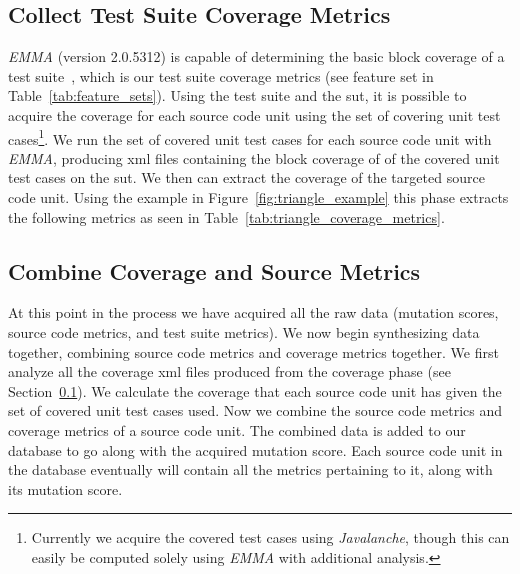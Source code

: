 \subsection{Collect Test Suite Coverage Metrics}
\label{subsec:approach_collect_coverage_metrics}
\emph{EMMA} (version 2.0.5312) is capable of determining the basic block coverage of a test suite~\cite{EMMA}, which is our test suite coverage metrics (see feature set  in Table~\ref{tab:feature_sets}). Using the test suite and the \gls{sut}, it is possible to acquire the coverage for each source code unit using the set of covering unit test cases\footnote{Currently we acquire the covered test cases using \emph{Javalanche}, though this can easily be computed solely using \emph{EMMA} with additional analysis.}. We run the set of covered unit test cases for each source code unit with \emph{EMMA}, producing \gls{xml} files containing the block coverage of of the covered unit test cases on the \gls{sut}. We then can extract the coverage of the targeted source code unit. Using the example in Figure~\ref{fig:triangle_example} this phase extracts the following metrics as seen in Table~\ref{tab:triangle_coverage_metrics}.


\subsection{Combine Coverage and Source Metrics}
\label{subsec:approach_combine_metrics}
At this point in the process we have acquired all the raw data (mutation scores, source code metrics, and test suite metrics). We now begin synthesizing data together, combining source code metrics and coverage metrics together. We first analyze all the coverage \gls{xml} files produced from the coverage phase (see Section~\ref{subsec:approach_collect_coverage_metrics}). We calculate the coverage that each source code unit has given the set of covered unit test cases used. Now we combine the source code metrics and coverage metrics of a source code unit. The combined data is added to our database to go along with the acquired mutation score. Each source code unit in the database eventually will contain all the metrics pertaining to it, along with its mutation score.

